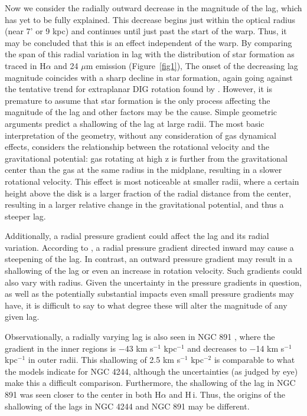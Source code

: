 \documentclass{emulateapj}
\begin{document}
\par
    Now we consider the radially outward decrease in the magnitude of the lag, which has yet to be fully explained.  This decrease begins just within the optical radius (near 7' or 9 kpc) and continues until just past the start of the warp.  Thus, it may be concluded that this is an effect independent of the warp. By comparing the span of this radial variation in lag with the distribution of star formation as traced in H$\alpha$ and 24 $\mu$m emission (Figure~\ref{fig1}),  The onset of the decreasing lag magnitude coincides with a sharp decline in star formation, again going against the tentative trend for extraplanar DIG rotation found by \citet{2007ApJ...663..933H}. However, it is premature to assume that star formation is the only process affecting the magnitude of the lag and other factors may be the cause.  Simple geometric arguments predict a shallowing of the lag at large radii.  The most basic interpretation of the geometry, without any consideration of gas dynamical effects, considers the relationship between the rotational velocity and the gravitational potential:  gas rotating at high z is further from the gravitational center than the gas at the same radius in the midplane, resulting in a slower rotational velocity.  This effect is most noticeable at smaller radii, where a certain height above the disk is a larger fraction of the radial distance from the center, resulting in a larger relative change in the gravitational potential, and thus a steeper lag. 

\par
    Additionally, a radial pressure gradient could affect the lag and its radial variation. According to \citet{2002ASPC..276..201B}, a radial pressure gradient directed inward may cause a steepening of the lag.  In contrast, an outward pressure gradient may result in a shallowing of the lag or even an increase in rotation velocity.  Such gradients could also vary with radius.  Given the uncertainty in the pressure gradients in question, as well as the potentially substantial impacts even small pressure gradients may have, it is difficult to say to what degree these will alter the magnitude of any given lag.  

\par
     Observationally, a radially varying lag is also seen in NGC 891 \citep{2007AJ....134.1019O}, where the gradient in the inner regions is $-$43 km s$^{-1}$ kpc$^{-1}$ and decreases to $-$14 km s$^{-1}$ kpc$^{-1}$ in outer radii.  This shallowing of 2.5 km s$^{-1}$ kpc$^{-2}$ is comparable to what the models indicate for NGC 4244, although the uncertainties (as judged by eye) make this a difficult comparison.  Furthermore, the shallowing of the lag in NGC 891 was seen closer to the center in both H{$\alpha$} \citep{2007A&A...468..951K} and {\sc H\,i}.  Thus, the origins of the shallowing of the lags in NGC 4244 and NGC 891 may be different.
 
\end{document}
